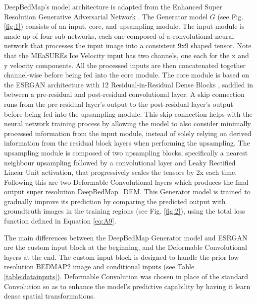 \documentclass[tc, manuscript]{copernicus}
\begin{document}
DeepBedMap's model architecture is adapted from the Enhanced Super Resolution Generative Adversarial Network \citep[ESRGAN,][]{WangESRGANEnhancedSuperResolution2019}.
The Generator model $G$ (see Fig. \ref{fig:1}) consists of an input, core, and upsampling module.
The input module is made up of four sub-networks, each one composed of a convolutional neural network that processes the input image into a consistent 9x9 shaped tensor.
Note that the MEaSUREs Ice Velocity \citep{MouginotMEaSUREsPhaseMap2019} input has two channels, one each for the x and y velocity components.
All the processed inputs are then concatenated together channel-wise before being fed into the core module.
The core module is based on the ESRGAN architecture with 12 Residual-in-Residual Dense Blocks \citep[see][for details]{WangESRGANEnhancedSuperResolution2019}, saddled in between a pre-residual and post-residual convolutional layer.
A skip connection runs from the pre-residual layer's output to the post-residual layer's output before being fed into the upsampling module.
This skip connection \citep{HeIdentityMappingsDeep2016} helps with the neural network training process by allowing the model to also consider minimally processed information from the input module, instead of solely relying on derived information from the residual block layers when performing the upsampling.
The upsampling module is composed of two upsampling blocks, specifically a nearest neighbour upsampling followed by a convolutional layer and Leaky Rectified Linear Unit \citep[LeakyReLU,][]{MaasRectifiernonlinearitiesimprove2013} activation, that progressively scales the tensors by 2x each time.
Following this are two Deformable Convolutional layers \citep{DaiDeformableConvolutionalNetworks2017} which produces the final output super resolution DeepBedMap\_DEM.
This Generator model is trained to gradually improve its prediction by comparing the predicted output with groundtruth images in the training regions (see Fig. \ref{fig:2}), using the total loss function defined in Equation \eqref{eq:A9}.

The main differences between the DeepBedMap Generator model and ESRGAN are the custom input block at the beginning, and the Deformable Convolutional layers at the end.
The custom input block is designed to handle the prior low resolution BEDMAP2 image and conditional inputs (see Table \ref{table:datainputs}).
Deformable Convolution was chosen in place of the standard Convolution so as to enhance the model's predictive capability by having it learn dense spatial transformations.
\end{document}
